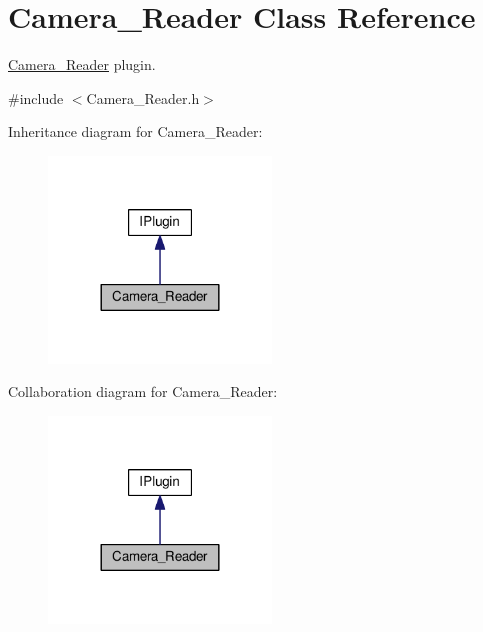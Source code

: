 \hypertarget{class_camera___reader}{}\section{Camera\+\_\+\+Reader Class Reference}
\label{class_camera___reader}


\hyperlink{class_camera___reader}{Camera\+\_\+\+Reader} plugin.  




{\ttfamily \#include $<$Camera\+\_\+\+Reader.\+h$>$}



Inheritance diagram for Camera\+\_\+\+Reader\+:\nopagebreak
\begin{figure}[H]
\begin{center}
\leavevmode
\includegraphics[width=168pt]{class_camera___reader__inherit__graph}
\end{center}
\end{figure}


Collaboration diagram for Camera\+\_\+\+Reader\+:\nopagebreak
\begin{figure}[H]
\begin{center}
\leavevmode
\includegraphics[width=168pt]{class_camera___reader__coll__graph}
\end{center}
\end{figure}
